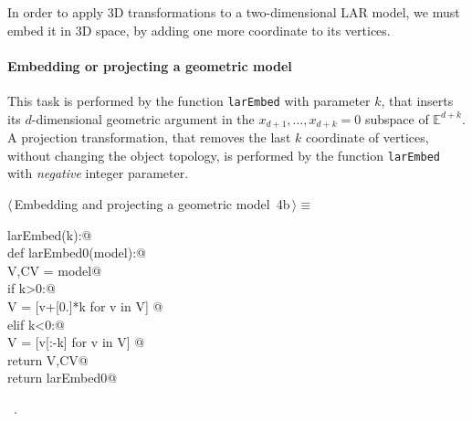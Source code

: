\documentclass[11pt,oneside]{article}	%
\def\E{\mathbb{E}}
\begin{document}
In order to apply 3D transformations to a two-dimensional LAR model, we must embed it in 3D space, by adding one more coordinate to its vertices. 

\paragraph{Embedding or projecting a geometric model}

This task is performed by the function \texttt{larEmbed} with parameter $k$, that inserts its $d$-dimensional geometric argument in the $x_{d+1}, \ldots, x_{d+k}=0$ subspace of $\E^{d+k}$.
A projection transformation, that removes the last $k$ coordinate of vertices, without changing the object topology, is performed by the function \texttt{larEmbed} with \emph{negative} integer parameter.


\begin{flushleft} \small \label{scrap5}
\protect{}$\langle\,$Embedding and projecting a geometric model\nobreak\ {\footnotesize 4b}$\,\rangle\equiv$
\vspace{-1ex}
\begin{list}{}{} \item
\mbox{}\verb@def larEmbed(k):@\\
\mbox{}\verb@   def larEmbed0(model):@\\
\mbox{}\verb@      V,CV = model@\\
\mbox{}\verb@      if k>0:@\\
\mbox{}\verb@         V = [v+[0.]*k for v in V] @\\
\mbox{}\verb@      elif k<0:@\\
\mbox{}\verb@         V = [v[:-k] for v in V] @\\
\mbox{}\verb@      return V,CV@\\
\mbox{}\verb@   return larEmbed0@\\
\mbox{}\verb@@{\NWsep}
\end{list}
\vspace{-1ex}
\footnotesize\addtolength{\baselineskip}{-1ex}
\begin{list}{}{\setlength{\itemsep}{-\parsep}\setlength{\itemindent}{-\leftmargin}}
\item \NWtxtMacroRefIn\ .
\end{list}
\end{flushleft}
\end{document}
